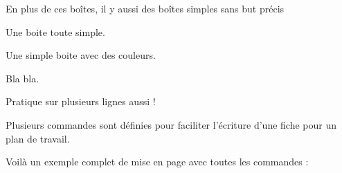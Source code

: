 \documentclass[12pt]{extarticle}
\begin{document}
En plus de ces boîtes, il y aussi des boîtes simples sans but précis
\begin{boiteCodeTex}{}
  \begin{boite}
    Une boite toute simple.
  \end{boite}

  \begin{boiteColoree}
  \end{boiteColoree}
  
  \begin{boiteColoree}[yellow-150]
    Une simple boite avec des couleurs.
  \end{boiteColoree}

  \begin{boiteColoree}
    Bla bla.

    Pratique sur plusieurs lignes aussi !
  \end{boiteColoree}

  \rectangle
  \rectangle[largeur = 4cm, hauteur = 1.5cm]
  \rectangle[couleur = couleurSec]
  \rectangle[largeur = 8cm, hauteur = 2cm, couleur = couleurTer]

\end{boiteCodeTex}

\label{plan_de_travail}

Plusieurs commandes sont définies pour faciliter l'écriture d'une fiche pour un plan de travail.


Voilà un exemple complet de mise en page avec toutes les commandes :
\end{document}
